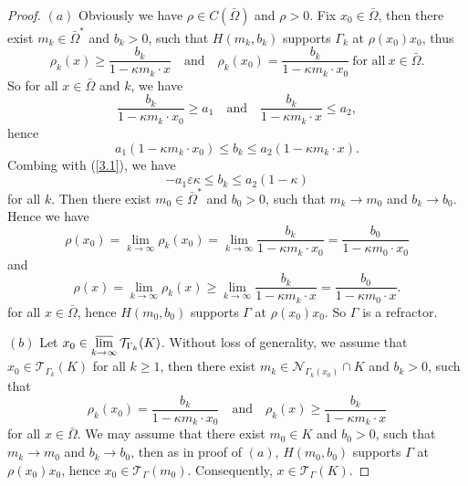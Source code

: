 \documentclass[a4paper,12pt,]{article}
\numberwithin{equation}{section}
\numberwithin{equation}{section} \allowdisplaybreaks
\begin{document}
\begin{proof}
  $(a)$ Obviously we have $\rho \in C(\bar{\Omega})$ and $\rho >0$. Fix $x_{0} \in \bar{\Omega}$, then there exist $m_{k} \in \bar{\Omega}^{\ast}$ and $b_{k} >0$, such that $H(m_{k},b_{k})$ supports $\Gamma_{k}$ at $\rho(x_{0})x_{0}$, thus
  $$\rho_{k}(x) \geq \frac{b_{k}}{1 - \kappa m_{k}\cdot x} \quad \text{and} \quad \rho_{k}(x_{0}) = \frac{b_{k}}{1 - \kappa m_{k}\cdot x_{0}}~\text{for all} ~x\in \bar{\Omega}.$$
  So for all $x\in \bar{\Omega}$ and $k$, we have
  $$\frac{b_{k}}{1 - \kappa m_{k}\cdot x_{0}} \geq a_{1} \quad \text{and} \quad \frac{b_{k}}{1 - \kappa m_{k}\cdot x}\leq a_{2},$$
  hence
  $$a_{1}(1 - \kappa m_{k}\cdot x_{0}) \leq b_{k} \leq a_{2}(1 - \kappa m_{k}\cdot x).$$
  Combing with (\ref{3.1}), we have
  $$-a_{1}\varepsilon \kappa \leq b_{k} \leq a_{2}(1 - \kappa)$$
  for all $k$. Then there exist $m_{0} \in \bar{\Omega}^{\ast}$ and $b_{0} >0$, such that $m_{k}\rightarrow m_{0}$ and $b_{k}\rightarrow b_{0}$. Hence we have
  $$\rho(x_{0}) = \lim_{k\rightarrow \infty}\rho_{k}(x_{0}) = \lim_{k\rightarrow \infty}\frac{b_{k}}{1 - \kappa m_{k}\cdot x_{0}} = \frac{b_{0}}{1 - \kappa m_{0}\cdot x_{0}}$$
  and
  $$\rho(x) = \lim_{k\rightarrow \infty}\rho_{k}(x) \geq \lim_{k\rightarrow \infty}\frac{b_{k}}{1 - \kappa m_{k}\cdot x} = \frac{b_{0}}{1 - \kappa m_{0}\cdot x}.$$
  for all $x\in \bar{\Omega}$, hence $H(m_{0},b_{0})$ supports $\Gamma$ at $\rho(x_{0})x_{0}$. So $\Gamma$ is a refractor.

   $(b)$ Let $x_{0} \in \varlimsup\limits_{k\rightarrow \infty} \mathcal{T}_{\Gamma_{k}}(K)$. Without loss of generality, we assume that $x_{0} \in \mathcal{T}_{\Gamma_{k}}(K)$ for all $k \geq 1$, then there exist $m_{k} \in \mathcal{N}_{\Gamma_{k}(x_{0})} \cap K$ and $b_{k} >0$, such that
   $$\rho_{k}(x_{0}) = \frac{b_{k}}{1 - \kappa m_{k}\cdot x_{0}} \quad \text{and} \quad \rho_{k}(x) \geq \frac{b_{k}}{1 - \kappa m_{k}\cdot x}$$
   for all $x \in \bar{\Omega}$. We may assume that there exist $m_{0} \in K$ and $b_{0} >0$, such that $m_{k}\rightarrow m_{0}$ and $b_{k}\rightarrow b_{0}$, then as in proof of $(a)$, $H(m_{0},b_{0})$ supports $\Gamma$ at $\rho(x_{0})x_{0}$, hence $x_{0} \in \mathcal{T}_{\Gamma}(m_{0})$. Consequently, $x \in \mathcal{T}_{\Gamma}(K)$.


\end{proof}
\end{document}
